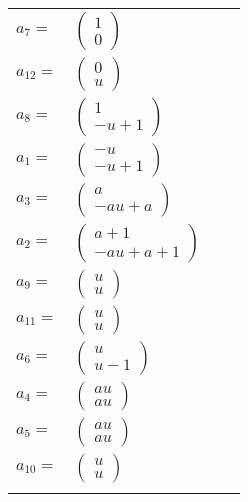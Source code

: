 \documentclass[1p]{elsarticle_modified}
\theoremstyle{definition}
\begin{document}
\begin{tabular}{m{7pt} m{180pt} m{7pt} m{180pt} }
\flushright $a_{7}=$&$\begin{pmatrix}1\\0\end{pmatrix}$ \\
\flushright $a_{12}=$&$\begin{pmatrix}0\\u\end{pmatrix}$ \\
\flushright $a_{8}=$&$\begin{pmatrix}1\\- u+1\end{pmatrix}$ \\
\flushright $a_{1}=$&$\begin{pmatrix}- u\\- u+1\end{pmatrix}$ \\
\flushright $a_{3}=$&$\begin{pmatrix}a\\- a u+a\end{pmatrix}$ \\
\flushright $a_{2}=$&$\begin{pmatrix}a+1\\- a u+a+1\end{pmatrix}$ \\
\flushright $a_{9}=$&$\begin{pmatrix}u\\u\end{pmatrix}$ \\
\flushright $a_{11}=$&$\begin{pmatrix}u\\u\end{pmatrix}$ \\
\flushright $a_{6}=$&$\begin{pmatrix}u\\u-1\end{pmatrix}$ \\
\flushright $a_{4}=$&$\begin{pmatrix}a u\\a u\end{pmatrix}$ \\
\flushright $a_{5}=$&$\begin{pmatrix}a u\\a u\end{pmatrix}$ \\
\flushright $a_{10}=$&$\begin{pmatrix}u\\u\end{pmatrix}$\\&\end{tabular}
\end{document}
